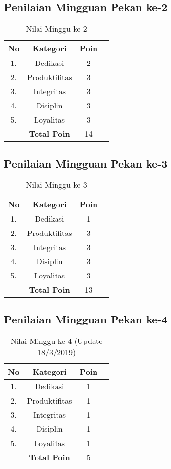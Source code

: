 \subsection{Penilaian Mingguan Pekan ke-2}

\begin{table}[htp]
\centering
\caption{Nilai Minggu ke-2}
\label{tab:nm02}
\begin{tabular}{|c|c|c|p{\textwidth}|}
\hline
\textbf{No} & \textbf{Kategori} & \textbf{Poin} \\ \hline
1. & Dedikasi & 2 \\ \hline
2. & Produktifitas & 3 \\ \hline
3. & Integritas & 3 \\ \hline
4. & Disiplin & 3 \\ \hline
5. & Loyalitas & 3 \\ \hline
 & \textbf{Total Poin} & 14 \\ \hline
\end{tabular}
\end{table}

\subsection{Penilaian Mingguan Pekan ke-3}

\begin{table}[htp]
\centering
\caption{Nilai Minggu ke-3}
\label{tab:nm03}
\begin{tabular}{|c|c|c|p{\textwidth}|}
\hline
\textbf{No} & \textbf{Kategori} & \textbf{Poin} \\ \hline
1. & Dedikasi & 1 \\ \hline
2. & Produktifitas & 3 \\ \hline
3. & Integritas & 3 \\ \hline
4. & Disiplin & 3 \\ \hline
5. & Loyalitas & 3 \\ \hline
 & \textbf{Total Poin} & 13 \\ \hline
\end{tabular}
\end{table}

\subsection{Penilaian Mingguan Pekan ke-4}

\begin{table}[htp]
\centering
\caption{Nilai Minggu ke-4 (Update 18/3/2019)}
\label{tab:nm04}
\begin{tabular}{|c|c|c|p{\textwidth}|}
\hline
\textbf{No} & \textbf{Kategori} & \textbf{Poin} \\ \hline
1. & Dedikasi & 1 \\ \hline
2. & Produktifitas & 1 \\ \hline
3. & Integritas & 1 \\ \hline
4. & Disiplin & 1 \\ \hline
5. & Loyalitas & 1 \\ \hline
 & \textbf{Total Poin} & 5 \\ \hline
\end{tabular}
\end{table}


